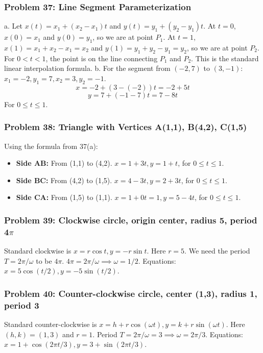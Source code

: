 \documentclass{article}
\begin{document}
\subsubsection{Problem 37: Line Segment Parameterization}
a. Let \(x(t) = x_1 + (x_2-x_1)t\) and \(y(t) = y_1 + (y_2-y_1)t\).
At \(t=0\), \(x(0)=x_1\) and \(y(0)=y_1\), so we are at point \(P_1\).
At \(t=1\), \(x(1)=x_1+x_2-x_1=x_2\) and \(y(1)=y_1+y_2-y_1=y_2\), so we are at point \(P_2\).
For \(0<t<1\), the point is on the line connecting \(P_1\) and \(P_2\). This is the standard linear interpolation formula.
b. For the segment from \((-2,7)\) to \((3,-1)\):
\(x_1=-2, y_1=7, x_2=3, y_2=-1\).
\[x = -2 + (3 - (-2))t = -2 + 5t\]
\[y = 7 + (-1 - 7)t = 7 - 8t\]
For \(0 \le t \le 1\).

\subsubsection{Problem 38: Triangle with Vertices A(1,1), B(4,2), C(1,5)}
Using the formula from 37(a):
\begin{itemize}
    \item \textbf{Side AB:} From (1,1) to (4,2). \(x = 1+3t, y=1+t\), for \(0 \le t \le 1\).
    \item \textbf{Side BC:} From (4,2) to (1,5). \(x = 4-3t, y=2+3t\), for \(0 \le t \le 1\).
    \item \textbf{Side CA:} From (1,5) to (1,1). \(x = 1+0t=1, y=5-4t\), for \(0 \le t \le 1\).
\end{itemize}

\subsubsection{Problem 39: Clockwise circle, origin center, radius 5, period 4\(\pi\)}
Standard clockwise is \(x=r\cos t, y=-r\sin t\). Here \(r=5\). We need the period \(T=2\pi/\omega\) to be \(4\pi\).
\(4\pi = 2\pi/\omega \implies \omega = 1/2\).
Equations: \(x = 5\cos(t/2), y = -5\sin(t/2)\).

\subsubsection{Problem 40: Counter-clockwise circle, center (1,3), radius 1, period 3}
Standard counter-clockwise is \(x=h+r\cos(\omega t), y=k+r\sin(\omega t)\). Here \((h,k)=(1,3)\) and \(r=1\).
Period \(T = 2\pi/\omega = 3 \implies \omega = 2\pi/3\).
Equations: \(x = 1+\cos(2\pi t/3), y=3+\sin(2\pi t/3)\).
\end{document}
